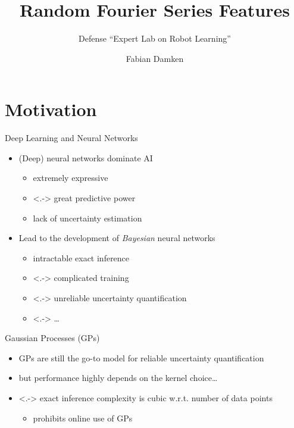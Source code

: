 \documentclass[
	USenglish,
	aspectratio=43,
	color={accentcolor=1c},
	logo=true,
	colorframetitle=true,
	hyperref={pdfpagelabels=true},
]{tudabeamer}
\title{Random Fourier Series Features}
\subtitle{Defense \enquote{Expert Lab on Robot Learning}}
\author{Fabian Damken}
\institute{Intelligent Autonomous Systems}
\date{\formatdate{20}{05}{2022}}
\begin{document}
	\maketitle

	\section{Motivation}
		\begin{frame}{Deep Learning and Neural Networks}
			\begin{itemize}
				\item<+-> (Deep) neural networks dominate AI
					\begin{itemize}
						\item<+-> extremely expressive
						\item<.-> great predictive power
						\item<+-> lack of uncertainty estimation
					\end{itemize}
				\item<+-> Lead to the development of \emph{Bayesian} neural networks
					\begin{itemize}
						\item<+-> intractable exact inference
						\item<.-> complicated training
						\item<.-> unreliable uncertainty quantification
						\item<.-> \dots
					\end{itemize}
			\end{itemize}
		\end{frame}

		\begin{frame}{Gaussian Processes (GPs)}
			\begin{itemize}
				\item<+-> GPs are still the go-to model for reliable uncertainty quantification
				\item<+-> but performance highly depends on the kernel choice\dots
				\item<.-> exact inference complexity is cubic w.r.t. number of data points
					\begin{itemize}
						\item prohibits online use of GPs
					\end{itemize}
			\end{itemize}
		\end{frame}
\end{document}
